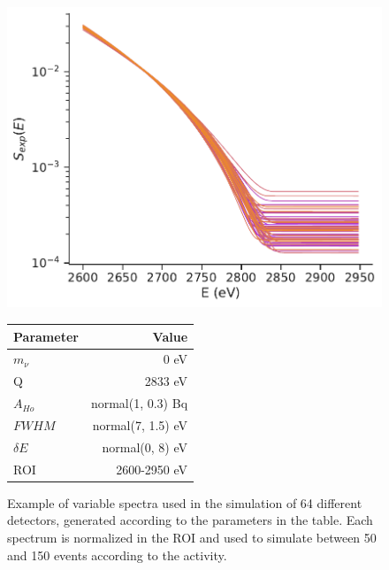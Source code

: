 \begin{figure}
  \begin{minipage}{0.45\linewidth}
    \includegraphics[width=\linewidth]{figures/ch3/endpoint/multispectrum_0.pdf}
  \end{minipage}
  \hfill
  \begin{minipage}{0.4\linewidth}
    \begin{tabular}{l r} \hline 
      \toprule
         Parameter & Value\\
         \midrule
         $m_\nu$& 0 eV\\
         Q& 2833 eV\\
         $A_{Ho}$& normal(1, 0.3) Bq\\ 
         $FWHM$& normal(7, 1.5) eV\\
         $\delta E$& normal(0, 8) eV\\
         ROI& 2600-2950 eV\\ 
         \bottomrule
    \end{tabular}
  \end{minipage}

\caption{Example of variable spectra used in the simulation of 64 different detectors, generated according to the
parameters in the table. Each spectrum is normalized in the ROI and  used to simulate between 50 and 150 events
according to the activity.}
\label{}
\end{figure}

